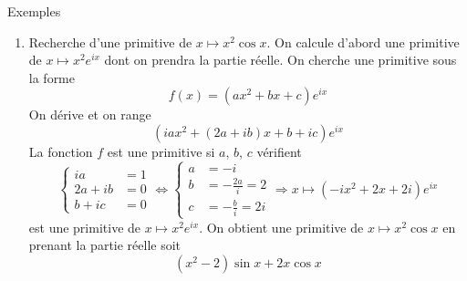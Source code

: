 Exemples
\begin{enumerate}
  \item Recherche d'une primitive de $x\mapsto x^2 \cos x$. \newline
On calcule d'abord une primitive de $x \mapsto x^2 e^{ix}$ dont on prendra la partie réelle.\newline
On cherche une primitive sous la forme
\begin{displaymath}
  f(x) = (ax^2+bx+c)e^{ix}
\end{displaymath}
On dérive et on range
\begin{displaymath}
  (iax^2 +(2a+ib)x + b +ic)e^{ix}
\end{displaymath}
La fonction $f$ est une primitive si $a$, $b$, $c$ vérifient
\begin{displaymath}
\left\lbrace  
\begin{aligned}
  ia &= 1 \\ 2a+ib &= 0 \\ b + ic &= 0
\end{aligned}
\right. 
\Leftrightarrow
\left\lbrace 
\begin{aligned}
  a &= -i \\ b &=-\frac{2a}{i} = 2 \\ c &= -\frac{b}{i} = 2i
\end{aligned}
\right. 
\Rightarrow x\mapsto \left(-i x^2 +2x +2i\right) e^{ix} 
\end{displaymath}
est une primitive de $x \mapsto x^2 e^{ix}$. On obtient une primitive de $x\mapsto x^2 \cos x$ en prenant la partie réelle soit
\begin{displaymath}
  (x^2 -2)\sin x + 2x\cos x
\end{displaymath}


\end{enumerate}
